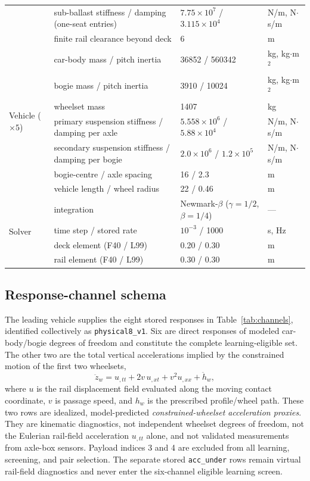 \begin{table}[htbp]
{\begin{tabular}{llll}
 & sub-ballast stiffness / damping (one-seat entries) & $7.75\times10^{7}$ / $3.115\times10^{4}$ & N/m, N$\cdot$s/m \\
 & finite rail clearance beyond deck & 6 & m \\
\midrule
\multirow{7}{*}{Vehicle ($\times5$)}
 & car-body mass / pitch inertia & 36852 / 560342 & kg, kg$\cdot$m$^2$ \\
 & bogie mass / pitch inertia & 3910 / 10024 & kg, kg$\cdot$m$^2$ \\
 & wheelset mass & 1407 & kg \\
 & primary suspension stiffness / damping per axle & $5.558\times10^{6}$ / $5.88\times10^{4}$ & N/m, N$\cdot$s/m \\
 & secondary suspension stiffness / damping per bogie & $2.0\times10^{6}$ / $1.2\times10^{5}$ & N/m, N$\cdot$s/m \\
 & bogie-centre / axle spacing & 16 / 2.3 & m \\
 & vehicle length / wheel radius & 22 / 0.46 & m \\
\midrule
\multirow{4}{*}{Solver}
 & integration & Newmark-$\beta$ ($\gamma=1/2$, $\beta=1/4$) & --- \\
 & time step / stored rate & $10^{-3}$ / 1000 & s, Hz \\
 & deck element (F40 / L99) & 0.20 / 0.30 & m \\
 & rail element (F40 / L99) & 0.30 / 0.30 & m \\
\bottomrule
\end{tabular}%
}
\end{table}

\subsection{Response-channel schema}
\label{sec:response_channels}

The leading vehicle supplies the eight stored responses in
Table~\ref{tab:channels}, identified collectively as
\texttt{physical8\_v1}. Six are direct responses of modeled car-body/bogie
degrees of freedom and constitute the complete learning-eligible set. The
other two are the total vertical accelerations implied
by the constrained motion of the first two wheelsets,
\begin{equation}
  \ddot z_w = u_{,tt} + 2v\,u_{,xt} + v^2 u_{,xx} + \ddot h_w,
  \label{eq:wheelset_proxy}
\end{equation}
where $u$ is the rail displacement field evaluated along the moving contact
coordinate, $v$ is passage speed, and $h_w$ is the prescribed profile/wheel
path. These two rows are idealized, model-predicted
\emph{constrained-wheelset acceleration proxies}. They are kinematic
diagnostics, not independent wheelset degrees of freedom, not the Eulerian
rail-field acceleration $u_{,tt}$ alone, and not validated measurements from
axle-box sensors. Payload indices 3 and 4 are excluded from all learning,
screening, and pair selection.
The separate stored \texttt{acc\_under} rows remain virtual rail-field
diagnostics and never enter the six-channel eligible learning screen.

